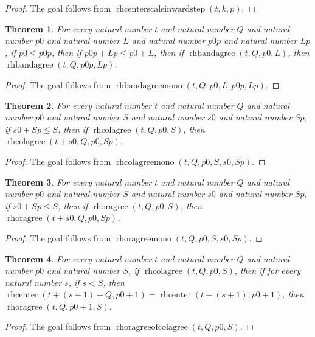 \documentclass[11pt]{article}
\newtheorem{theorem}{Theorem}[section]
\theoremstyle{definition}
\begin{document}
\begin{proof}
The goal follows from \(\operatorname{rhcenterscaleinwardstep}(t, k, p)\).
\end{proof}
\begin{theorem}
\label{ll:paper:rhbandagree-mono}
For every natural number \(t\) and natural number \(Q\) and natural number \(p0\) and natural number \(L\) and natural number \(p0p\) and natural number \(Lp\), if \(p0 \le p0p\), then if \(p0p + Lp \le p0 + L\), then if \(\operatorname{rhbandagree}(t, Q, p0, L)\), then \(\operatorname{rhbandagree}(t, Q, p0p, Lp)\).
\end{theorem}
\begin{proof}
The goal follows from \(\operatorname{rhbandagreemono}(t, Q, p0, L, p0p, Lp)\).
\end{proof}
\begin{theorem}
\label{ll:paper:rhcolagree-mono}
For every natural number \(t\) and natural number \(Q\) and natural number \(p0\) and natural number \(S\) and natural number \(s0\) and natural number \(Sp\), if \(s0 + Sp \le S\), then if \(\operatorname{rhcolagree}(t, Q, p0, S)\), then \(\operatorname{rhcolagree}(t + s0, Q, p0, Sp)\).
\end{theorem}
\begin{proof}
The goal follows from \(\operatorname{rhcolagreemono}(t, Q, p0, S, s0, Sp)\).
\end{proof}
\begin{theorem}
\label{ll:paper:rhoragree-mono}
For every natural number \(t\) and natural number \(Q\) and natural number \(p0\) and natural number \(S\) and natural number \(s0\) and natural number \(Sp\), if \(s0 + Sp \le S\), then if \(\operatorname{rhoragree}(t, Q, p0, S)\), then \(\operatorname{rhoragree}(t + s0, Q, p0, Sp)\).
\end{theorem}
\begin{proof}
The goal follows from \(\operatorname{rhoragreemono}(t, Q, p0, S, s0, Sp)\).
\end{proof}
\begin{theorem}
\label{ll:paper:rhoragree-of-col-agree}
For every natural number \(t\) and natural number \(Q\) and natural number \(p0\) and natural number \(S\), if \(\operatorname{rhcolagree}(t, Q, p0, S)\), then if for every natural number \(s\), if \(s < S\), then \(\operatorname{rhcenter}(t + (s + 1) + Q, p0 + 1) = \operatorname{rhcenter}(t + (s + 1), p0 + 1)\), then \(\operatorname{rhoragree}(t, Q, p0 + 1, S)\).
\end{theorem}
\begin{proof}
The goal follows from \(\operatorname{rhoragreeofcolagree}(t, Q, p0, S)\).
\end{proof}
\end{document}

